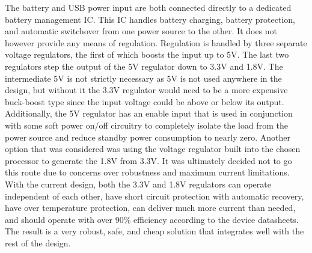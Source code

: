 The battery and USB power input are both connected directly to a dedicated 
battery management IC. This IC handles battery charging, battery protection, 
and automatic switchover from one power source to the other. It does not 
however provide any means of regulation. Regulation is handled by three 
separate voltage regulators, the first of which boosts the input up to 5V. The 
last two regulators step the output of the 5V regulator down to 3.3V and 1.8V. 
The intermediate 5V is not strictly necessary as 5V is not used anywhere in the 
design, but without it the 3.3V regulator would need to be a more expensive 
buck-boost type since the input voltage could be above or below its output. 
Additionally, the 5V regulator has an enable input that is used in conjunction 
with some soft power on/off circuitry to completely isolate the load from the 
power source and reduce standby power consumption to nearly zero. Another option 
that was considered was using the voltage regulator built into the chosen 
processor to generate the 1.8V from 3.3V. It was ultimately decided not to go 
this route due to concerns over robustness and maximum current limitations. With 
the current design, both the 3.3V and 1.8V regulators can operate independent of 
each other, have short circuit protection with automatic recovery, have over 
temperature protection, can deliver much more current than needed, and should 
operate with over 90\% efficiency according to the device datasheets. The result 
is a very robust, safe, and cheap solution that integrates well with the rest of 
the design.

